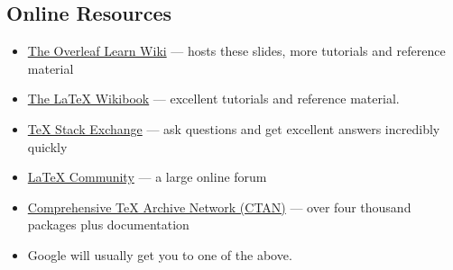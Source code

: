 \documentclass[aspectratio=169]{beamer}
\begin{document}
\subsection{Online Resources}
\begin{frame}{\insertsubsection}
\begin{itemize}
\item \href{https://www.overleaf.com/learn}{The Overleaf Learn Wiki} ---
hosts these slides, more tutorials and reference material
\item \href{http://en.wikibooks.org/wiki/LaTeX}{The \LaTeX{} Wikibook} ---
excellent tutorials and reference material.
\item \href{http://tex.stackexchange.com/}{\TeX{} Stack Exchange} --- ask
questions and get excellent answers incredibly quickly
\item \href{http://www.latex-community.org/}{\LaTeX{} Community} --- a large
online forum
\item \href{http://ctan.org/}{Comprehensive \TeX{} Archive Network (CTAN)} ---
over four thousand packages plus documentation
\item Google will usually get you to one of the above.
\end{itemize}
\end{frame}

\end{document}
